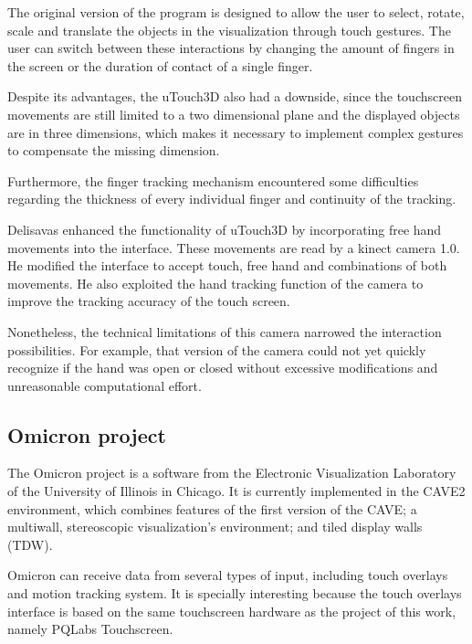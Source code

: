 \documentclass[12pt]{extarticle}
\begin{document}
The original version of the program is designed to allow the user to select, rotate, scale and translate the objects in the visualization through touch gestures. The user can switch between these interactions by changing the amount of fingers in the screen or the duration of contact of a single finger.

Despite its advantages, the uTouch3D also had a downside, since the touchscreen movements are still limited to a two dimensional plane and the displayed objects are in three dimensions, which makes it necessary to implement complex gestures to compensate the missing dimension.

Furthermore, the finger tracking mechanism encountered some difficulties regarding the thickness of every individual finger and continuity of the tracking.

Delisavas enhanced the functionality of uTouch3D by incorporating free hand movements into the interface. These movements are read by a kinect camera 1.0. He modified the interface to accept touch, free hand and combinations of both movements. He also exploited the hand tracking function of the camera to improve the tracking accuracy of the touch screen.

Nonetheless, the technical limitations of this camera narrowed the interaction possibilities. For example, that version of the camera could not yet quickly recognize if the hand was open or closed without excessive modifications and unreasonable computational effort.

\subsection {Omicron project \cite{SAGE2}}
The Omicron project is a software from the Electronic Visualization Laboratory of the University of Illinois in Chicago. It is currently implemented in the CAVE2 environment, which combines features of the first version of the CAVE; a multiwall, stereoscopic visualization's environment; and tiled display walls (TDW).

Omicron can receive data from several types of input, including touch overlays and motion tracking system. It is specially interesting because the touch overlays interface is based on the same touchscreen hardware as the project of this work, namely PQLabs Touchscreen.

\end{document}
